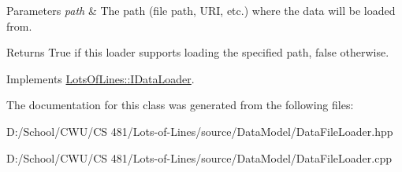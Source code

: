 \begin{DoxyParams}{Parameters}
{\em path} & The path (file path, U\+RI, etc.) where the data will be loaded from. \\
\hline
\end{DoxyParams}
\begin{DoxyReturn}{Returns}
True if this loader supports loading the specified path, false otherwise. 
\end{DoxyReturn}


Implements \hyperlink{class_lots_of_lines_1_1_i_data_loader_a73f9ee96a55bd6d339d5028f951240f9}{Lots\+Of\+Lines\+::\+I\+Data\+Loader}.



The documentation for this class was generated from the following files\+:\begin{DoxyCompactItemize}
\item 
D\+:/\+School/\+C\+W\+U/\+C\+S 481/\+Lots-\/of-\/\+Lines/source/\+Data\+Model/Data\+File\+Loader.\+hpp\item 
D\+:/\+School/\+C\+W\+U/\+C\+S 481/\+Lots-\/of-\/\+Lines/source/\+Data\+Model/Data\+File\+Loader.\+cpp\end{DoxyCompactItemize}
